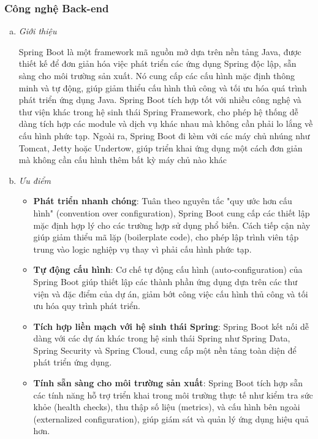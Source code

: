 \subsubsection{Công nghệ Back-end}
\begin{enumerate}[(a)]
	\item \textit{Giới thiệu}

	      Spring Boot là một framework mã nguồn mở dựa trên nền tảng Java, được thiết kế để đơn giản hóa việc phát triển các ứng dụng Spring độc lập, sẵn sàng cho môi trường sản xuất. Nó cung cấp các cấu hình mặc định thông minh và tự động, giúp giảm thiểu cấu hình thủ công và tối ưu hóa quá trình phát triển ứng dụng Java. Spring Boot tích hợp tốt với nhiều công nghệ và thư viện khác trong hệ sinh thái Spring Framework, cho phép hệ thống dễ dàng tích hợp các module và dịch vụ khác nhau mà không cần phải lo lắng về cấu hình phức tạp. Ngoài ra, Spring Boot đi kèm với các máy chủ nhúng như Tomcat, Jetty hoặc Undertow, giúp triển khai ứng dụng một cách đơn giản mà không cần cấu hình thêm bất kỳ máy chủ nào khác

	\item \textit{Ưu điểm} \cite{SpringBootBenefits}

	      \begin{itemize}
		      \item \textbf{Phát triển nhanh chóng}: Tuân theo nguyên tắc "quy ước hơn cấu hình" (convention over configuration), Spring Boot cung cấp các thiết lập mặc định hợp lý cho các trường hợp sử dụng phổ biến. Cách tiếp cận này giúp giảm thiểu mã lặp (boilerplate code), cho phép lập trình viên tập trung vào logic nghiệp vụ thay vì phải cấu hình phức tạp.
		      \item \textbf{Tự động cấu hình}: Cơ chế tự động cấu hình (auto-configuration) của Spring Boot giúp thiết lập các thành phần ứng dụng dựa trên các thư viện và đặc điểm của dự án, giảm bớt công việc cấu hình thủ công và tối ưu hóa quy trình phát triển.
		      \item \textbf{Tích hợp liền mạch với hệ sinh thái Spring}: Spring Boot kết nối dễ dàng với các dự án khác trong hệ sinh thái Spring như Spring Data, Spring Security và Spring Cloud, cung cấp một nền tảng toàn diện để phát triển ứng dụng.
		      \item \textbf{Tính sẵn sàng cho môi trường sản xuất}: Spring Boot tích hợp sẵn các tính năng hỗ trợ triển khai trong môi trường thực tế như kiểm tra sức khỏe (health checks), thu thập số liệu (metrics), và cấu hình bên ngoài (externalized configuration), giúp giám sát và quản lý ứng dụng hiệu quả hơn.
	      \end{itemize}


\end{enumerate}
